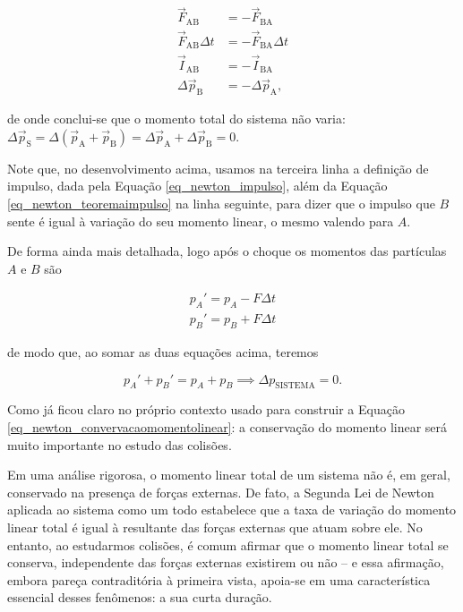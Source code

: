 \begin{align}
    \vec F_{\text{AB}} &= - \vec F_{\text{BA}} \nonumber \\
    \vec F_{\text{AB}} \Delta t &= - \vec F_{\text{BA}}\Delta t \nonumber \\
    \vec I_{\text{AB}}  &= - \vec I_{\text{BA}} \nonumber \\
    \Delta \vec p_{\text{B}} &= -  \Delta \vec p_{\text{A}}, \nonumber
\end{align}

\noindent de onde conclui-se que o momento total do sistema não varia: $\Delta \vec p_{\text{S}}  =  \Delta (\vec p_{\text{A}}+\vec p_{\text{B}}) = \Delta \vec p_{\text{A}} + \Delta \vec p_{\text{B}} = 0. $

Note que, no desenvolvimento acima, usamos na terceira linha a definição de impulso, dada pela Equação \eqref{eq_newton_impulso}, além da Equação \eqref{eq_newton_teoremaimpulso} na linha seguinte, para dizer que o impulso que $B$ sente é igual à variação do seu momento linear, o mesmo valendo para $A.$ 

De forma ainda mais detalhada, logo após o choque os momentos das partículas $A$ e $B$ são

\begin{align}
    p_A'= p_A - F\Delta t \nonumber \\
    p_B'= p_B + F\Delta t \nonumber 
\end{align}

\noindent de modo que, ao somar as duas equações acima, teremos

$$ p_A' + p_B'  = p_A + p_B \implies \boxed{\Delta p_\text{SISTEMA} =0.} $$


Como já ficou claro no próprio contexto usado para construir a Equação \eqref{eq_newton_convervacaomomentolinear}: a conservação do momento linear será muito importante no estudo das colisões. 


Em uma análise rigorosa, o momento linear total de um sistema não é, em geral, conservado na presença de forças externas. De fato, a Segunda Lei de Newton aplicada ao sistema como um todo estabelece que a taxa de variação do momento linear total é igual à resultante das forças externas que atuam sobre ele. No entanto, ao estudarmos colisões, é comum afirmar que o momento linear total se conserva, independente das forças externas existirem ou não -- e essa afirmação, embora pareça contraditória à primeira vista, apoia-se em uma característica essencial desses fenômenos: a sua curta duração.

